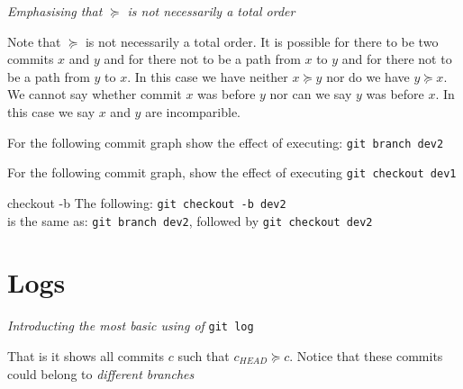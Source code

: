 

\frmrule

\textit{Emphasising that $\succeq$ is not necessarily a total order}

Note that $\succeq$ is not necessarily a total order. It is possible 
for there to be two commits $x$ and $y$ and for there not to be a 
path from $x$ to $y$ and for there not to be a path 
from $y$ to $x$. In this case we have neither $x \succeq y$ nor do we 
have $y \succeq x$. We cannot say whether commit $x$ was before $y$ nor 
can we say $y$ was before $x$. In this case we say $x$ and $y$ are incomparible. 

\begin{example}
For the following commit graph show the effect of executing:
\lstinline{git branch dev2}
\end{example}

\frmrule



\begin{example}
For the following commit graph, show the effect of executing 
\lstinline{git checkout dev1}
\end{example}

\frmrule 

\begin{sidenote}{checkout -b}
The following: 
\lstinline{git checkout -b dev2} \\
is the same as: 
\lstinline{git branch dev2}, followed by 
\lstinline{git checkout dev2}
\end{sidenote}


\section{Logs}


\frmrule 

\textit{Introducting the most basic using of} \lstinline{git log}




That is it shows all commits $c$ such that $c_{HEAD} \succeq c$.
Notice that these commits could belong to \textit{different branches}


